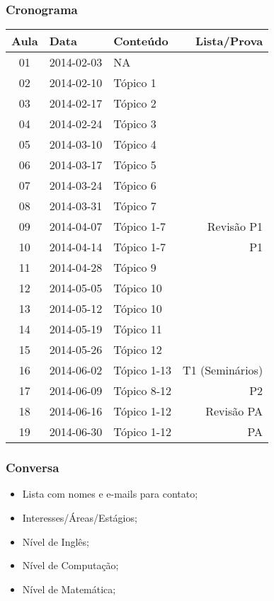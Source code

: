 \begin{frame}
\frametitle{Cronograma}
{\scriptsize
  \begin{longtable}[c]{@{}cllr@{}}
  Aula & Data & Conteúdo & Lista/Prova \\
  \midrule\endhead
  01 & 2014-02-03 & NA & \\
  02 & 2014-02-10 & Tópico 1 & \\
  03 & 2014-02-17 & Tópico 2 & \\
  04 & 2014-02-24 & Tópico 3 & \\
  05 & 2014-03-10 & Tópico 4 & \\
  06 & 2014-03-17 & Tópico 5 & \\
  07 & 2014-03-24 & Tópico 6 & \\
  08 & 2014-03-31 & Tópico 7 & \\
  09 & 2014-04-07 & Tópico 1-7 & Revisão P1 \\
  10 & 2014-04-14 & Tópico 1-7 & P1 \\
  11 & 2014-04-28 & Tópico 9 & \\
  12 & 2014-05-05 & Tópico 10 & \\
  13 & 2014-05-12 & Tópico 10 & \\
  14 & 2014-05-19 & Tópico 11 & \\
  15 & 2014-05-26 & Tópico 12 & \\
  16 & 2014-06-02 & Tópico 1-13 & T1 (Seminários) \\
  17 & 2014-06-09 & Tópico 8-12 & P2 \\
  18 & 2014-06-16 & Tópico 1-12 & Revisão PA \\
  19 & 2014-06-30 & Tópico 1-12 & PA \\
  \bottomrule
  \end{longtable}
  }
\end{frame}

\begin{frame}
    \frametitle{Conversa}
    \begin{itemize}
        \item Lista com nomes e e-mails para contato;
        \item Interesses/Áreas/Estágios;
        \item Nível de Inglês;
        \item Nível de Computação;
        \item Nível de Matemática;
    \end{itemize}
\end{frame}

